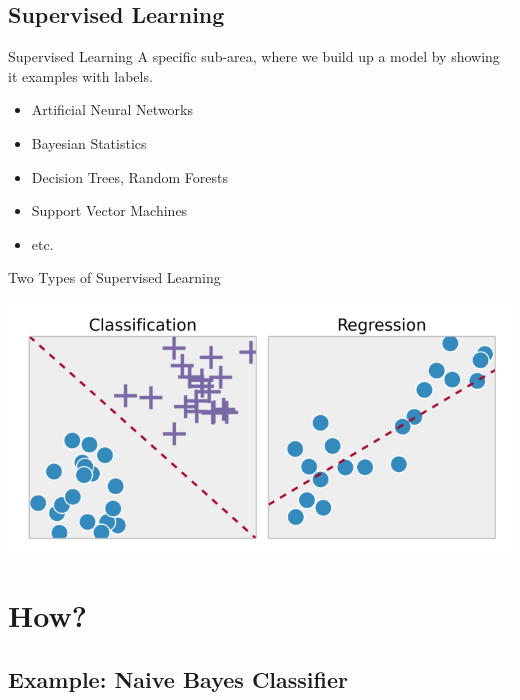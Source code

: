 \documentclass[15pt]{beamer}
\begin{document}
\subsection{Supervised Learning}


\begin{frame}{Supervised Learning}
    A specific sub-area, where we build up a \alert{model}
    by showing it \alert{examples} with \alert{labels}.

    \vspace{3mm}
    \begin{itemize}\itemsep0.6em
        \item Artificial Neural Networks
        \item Bayesian Statistics
        \item Decision Trees, Random Forests
        \item Support Vector Machines
        \item etc.
    \end{itemize}
\end{frame}


\begin{frame}{Two Types of Supervised Learning}
    \begin{center}
        \includegraphics[scale=.5]{img/class_regr.png}
    \end{center}
\end{frame}


\section{How?}
\subsection{Example: Naive Bayes Classifier}
\end{document}
